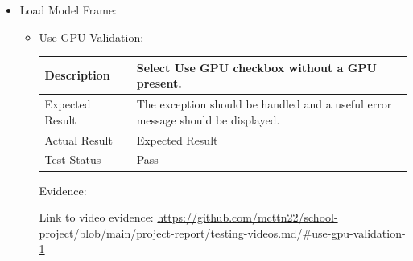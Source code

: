 \documentclass[./project-report/src/latex/project-report.tex]{subfiles}
\begin{document}
\begin{itemize}
    \pagebreak

    \item Load Model Frame:
    \label{sec:load-model-frame-input-validation}
    \begin{itemize}
        \item Use GPU Validation: \newline\newline
			\begin{tabular}{|p{0.25\linewidth}|p{0.75\linewidth}|}
				\hline
				Description & Select Use GPU checkbox without a GPU present. \\
				\hline
				Expected Result & The exception should be handled and a useful error message should be displayed. \\
				\hline
				Actual Result & Expected Result \\
				\hline
				Test Status & Pass \\
				\hline
			\end{tabular}
			
			\vspace{5mm}

			Evidence:
            \begin{figure}[h!]
			\centering
			\end{figure}

			Link to video evidence: \url{https://github.com/mcttn22/school-project/blob/main/project-report/testing-videos.md/#use-gpu-validation-1}
    \end{itemize}

    \pagebreak


\end{itemize}
\end{document}
